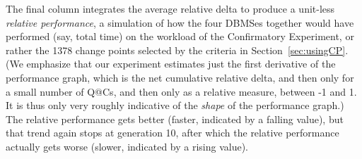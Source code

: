 \documentclass[prodmode,acmtods]{acmsmall}
\begin{document}
\begin{table}[t]
\end{table}

The final column integrates the average relative delta to produce a unit-less
{\em relative performance}, a simulation of how the four DBMSes together
would have performed (say, total time) on the workload of the Confirmatory
Experiment, or rather the 1378 change points selected by the criteria in
Section~\ref{sec:usingCP}. (We emphasize that our experiment estimates just
the first derivative of the performance graph, which is the net cumulative
relative delta, and then only for a small
number of Q@Cs, and then only as a relative measure, between -1 and 1. It is
thus only very roughly indicative of the {\em shape} of the performance graph.)
The relative performance gets better (faster, indicated by a falling
value), but that trend again stops at generation 10, after which the
relative performance actually gets worse (slower, indicated by a rising value).
\end{document}
